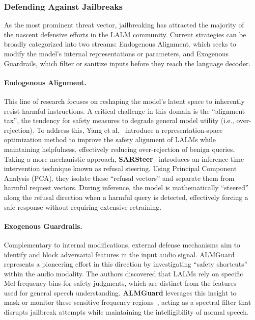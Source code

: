 \subsubsection{Defending Against Jailbreaks}

As the most prominent threat vector, jailbreaking has attracted the majority of the nascent defensive efforts in the LALM community. Current strategies can be broadly categorized into two streams: Endogenous Alignment, which seeks to modify the model's internal representations or parameters, and Exogenous Guardrails, which filter or sanitize inputs before they reach the language decoder.

\paragraph{Endogenous Alignment.}
This line of research focuses on reshaping the model's latent space to inherently resist harmful instructions. A critical challenge in this domain is the ``alignment tax'', the tendency for safety measures to degrade general model utility (i.e., over-rejection). To address this, Yang et al.~\cite{yang2025reshaping} introduce a representation-space optimization method to improve the safety alignment of LALMs while maintaining helpfulness, effectively reducing over-rejection of benign queries.
Taking a more mechanistic approach, \textbf{SARSteer}~\cite{lin2025sarsteer} introduces an inference-time intervention technique known as refusal steering. Using Principal Component Analysis (PCA), they isolate these ``refusal vectors'' and separate them from harmful request vectors. During inference, the model is mathematically ``steered'' along the refusal direction when a harmful query is detected, effectively forcing a safe response without requiring extensive retraining.

\paragraph{Exogenous Guardrails.}
Complementary to internal modifications, external defense mechanisms aim to identify and block adversarial features in the input audio signal. ALMGuard~\cite{jin2025almguard} represents a pioneering effort in this direction by investigating ``safety shortcuts'' within the audio modality. The authors discovered that LALMs rely on specific Mel-frequency bins for safety judgments, which are distinct from the features used for general speech understanding. \textbf{ALMGuard} leverages this insight to mask or monitor these sensitive frequency regions~\cite{jin2025almguard}, acting as a spectral filter that disrupts jailbreak attempts while maintaining the intelligibility of normal speech.

